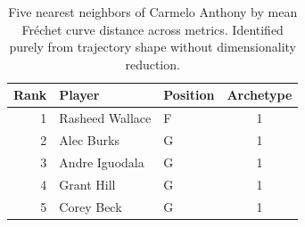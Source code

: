 \begin{table}[htbp]
  \centering\small
  \begin{tabular}{rllc}
    \toprule
    Rank & Player & Position & Archetype \\
    \midrule
    1 & Rasheed Wallace & F & 1 \\
    2 & Alec Burks & G & 1 \\
    3 & Andre Iguodala & G & 1 \\
    4 & Grant Hill & G & 1 \\
    5 & Corey Beck & G & 1 \\
    \bottomrule
  \end{tabular}
  \caption{Five nearest neighbors of Carmelo Anthony by mean Fr\'{e}chet curve distance across metrics. Identified purely from trajectory shape without dimensionality reduction.}
  \label{tab:Carmelo_Anthony_frechet_curve_neighbors}
\end{table}

